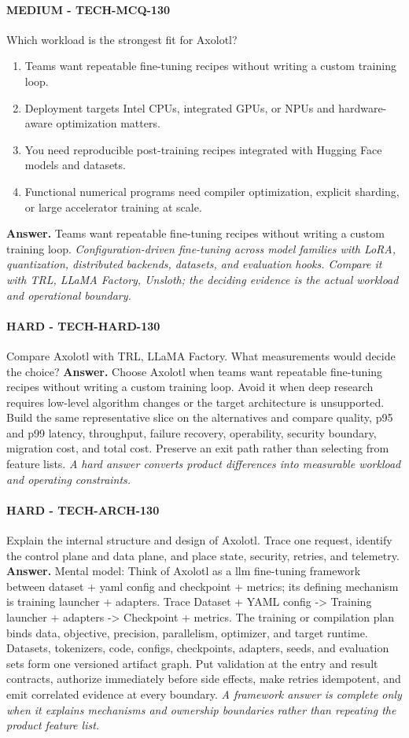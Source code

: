 \paragraph{MEDIUM - TECH-MCQ-130} Which workload is the strongest fit for Axolotl?
\begin{enumerate}[label=\Alph*.]
\item Teams want repeatable fine-tuning recipes without writing a custom training loop.
\item Deployment targets Intel CPUs, integrated GPUs, or NPUs and hardware-aware optimization matters.
\item You need reproducible post-training recipes integrated with Hugging Face models and datasets.
\item Functional numerical programs need compiler optimization, explicit sharding, or large accelerator training at scale.
\end{enumerate}
\textbf{Answer.} Teams want repeatable fine-tuning recipes without writing a custom training loop.
\textit{Configuration-driven fine-tuning across model families with LoRA, quantization, distributed backends, datasets, and evaluation hooks. Compare it with TRL, LLaMA Factory, Unsloth; the deciding evidence is the actual workload and operational boundary.}
\paragraph{HARD - TECH-HARD-130} Compare Axolotl with TRL, LLaMA Factory. What measurements would decide the choice?
\textbf{Answer.} Choose Axolotl when teams want repeatable fine-tuning recipes without writing a custom training loop. Avoid it when deep research requires low-level algorithm changes or the target architecture is unsupported. Build the same representative slice on the alternatives and compare quality, p95 and p99 latency, throughput, failure recovery, operability, security boundary, migration cost, and total cost. Preserve an exit path rather than selecting from feature lists.
\textit{A hard answer converts product differences into measurable workload and operating constraints.}
\paragraph{HARD - TECH-ARCH-130} Explain the internal structure and design of Axolotl. Trace one request, identify the control plane and data plane, and place state, security, retries, and telemetry.
\textbf{Answer.} Mental model: Think of Axolotl as a llm fine-tuning framework between dataset + yaml config and checkpoint + metrics; its defining mechanism is training launcher + adapters. Trace Dataset + YAML config -> Training launcher + adapters -> Checkpoint + metrics. The training or compilation plan binds data, objective, precision, parallelism, optimizer, and target runtime. Datasets, tokenizers, code, configs, checkpoints, adapters, seeds, and evaluation sets form one versioned artifact graph. Put validation at the entry and result contracts, authorize immediately before side effects, make retries idempotent, and emit correlated evidence at every boundary.
\textit{A framework answer is complete only when it explains mechanisms and ownership boundaries rather than repeating the product feature list.}
